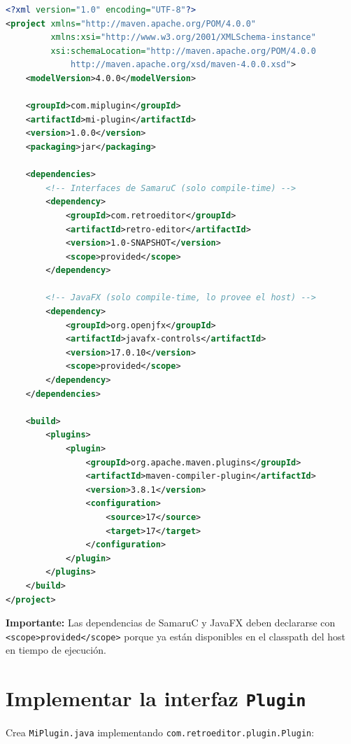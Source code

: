 \documentclass[../../main.tex]{subfiles}
\begin{document}
\begin{lstlisting}[language=xml, caption=Configuración Maven básica]
<?xml version="1.0" encoding="UTF-8"?>
<project xmlns="http://maven.apache.org/POM/4.0.0"
         xmlns:xsi="http://www.w3.org/2001/XMLSchema-instance"
         xsi:schemaLocation="http://maven.apache.org/POM/4.0.0
             http://maven.apache.org/xsd/maven-4.0.0.xsd">
    <modelVersion>4.0.0</modelVersion>

    <groupId>com.miplugin</groupId>
    <artifactId>mi-plugin</artifactId>
    <version>1.0.0</version>
    <packaging>jar</packaging>

    <dependencies>
        <!-- Interfaces de SamaruC (solo compile-time) -->
        <dependency>
            <groupId>com.retroeditor</groupId>
            <artifactId>retro-editor</artifactId>
            <version>1.0-SNAPSHOT</version>
            <scope>provided</scope>
        </dependency>

        <!-- JavaFX (solo compile-time, lo provee el host) -->
        <dependency>
            <groupId>org.openjfx</groupId>
            <artifactId>javafx-controls</artifactId>
            <version>17.0.10</version>
            <scope>provided</scope>
        </dependency>
    </dependencies>

    <build>
        <plugins>
            <plugin>
                <groupId>org.apache.maven.plugins</groupId>
                <artifactId>maven-compiler-plugin</artifactId>
                <version>3.8.1</version>
                <configuration>
                    <source>17</source>
                    <target>17</target>
                </configuration>
            </plugin>
        </plugins>
    </build>
</project>
\end{lstlisting}

\textbf{Importante:} Las dependencias de SamaruC y JavaFX deben declararse con \lstinline|<scope>provided</scope>| porque ya están disponibles en el classpath del host en tiempo de ejecución.

\section{Implementar la interfaz \lstinline|Plugin|}

Crea \lstinline|MiPlugin.java| implementando \lstinline|com.retroeditor.plugin.Plugin|:
\end{document}
